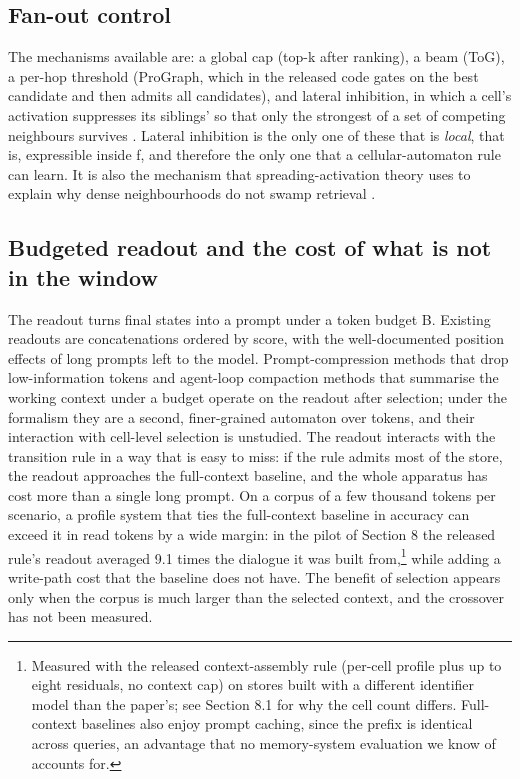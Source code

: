 \documentclass[11pt]{article}
\begin{document}
\subsection{Fan-out control}

The mechanisms available are: a global cap (top-k after ranking), a beam (ToG), a per-hop threshold (ProGraph, which in the released code gates on the best candidate and then admits all candidates), and lateral inhibition, in which a cell's activation suppresses its siblings' so that only the strongest of a set of competing neighbours survives \cite{synapse}. Lateral inhibition is the only one of these that is \emph{local}, that is, expressible inside f, and therefore the only one that a cellular-automaton rule can learn. It is also the mechanism that spreading-activation theory uses to explain why dense neighbourhoods do not swamp retrieval \cite{anderson1983}.

\subsection{Budgeted readout and the cost of what is not in the window}

The readout turns final states into a prompt under a token budget B. Existing readouts are concatenations ordered by score, with the well-documented position effects of long prompts \cite{lostinmiddle} left to the model. Prompt-compression methods that drop low-information tokens \cite{llmlingua,selectivecontext} and agent-loop compaction methods that summarise the working context under a budget \cite{acon,compactionrl,acm} operate on the readout after selection; under the formalism they are a second, finer-grained automaton over tokens, and their interaction with cell-level selection is unstudied. The readout interacts with the transition rule in a way that is easy to miss: if the rule admits most of the store, the readout approaches the full-context baseline, and the whole apparatus has cost more than a single long prompt. On a corpus of a few thousand tokens per scenario, a profile system that ties the full-context baseline in accuracy can exceed it in read tokens by a wide margin: in the pilot of Section 8 the released rule's readout averaged 9.1 times the dialogue it was built from,\footnote{Measured with the released context-assembly rule (per-cell profile plus up to eight residuals, no context cap) on stores built with a different identifier model than the paper's; see Section 8.1 for why the cell count differs. Full-context baselines also enjoy prompt caching, since the prefix is identical across queries, an advantage that no memory-system evaluation we know of accounts for.} while adding a write-path cost that the baseline does not have. The benefit of selection appears only when the corpus is much larger than the selected context, and the crossover has not been measured.
\end{document}

